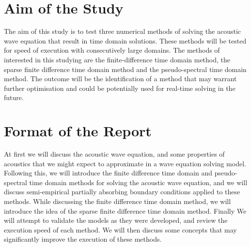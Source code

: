 \section{Aim of the Study}

The aim of this study is to test three numerical methods of solving the acoustic wave equation that result in time domain solutions. These methods will be tested for speed of execution with consecutively large domains. The methods of interested in this studying are the finite-difference time domain method, the sparse finite difference time domain method and the pseudo-spectral time domain method. The outcome will be the identification of a method that may warrant further optimisation and could be potentially used for real-time solving in the future.\\

\section{Format of the Report}
At first we will discuss the acoustic wave equation, and some properties of acoustics that we might expect to approximate in a wave equation solving model. Following this, we will introduce the finite difference time domain and pseudo-spectral time domain methods for solving the acoustic wave equation, and we will discuss semi-empirical partially absorbing boundary conditions applied to these methods. While discussing the finite difference time domain method, we will introduce the idea of the sparse finite difference time domain method. Finally We will attempt to validate the models as they were developed, and review the execution speed of each method. We will then discuss some concepts that may significantly improve the execution of these methods.\\
